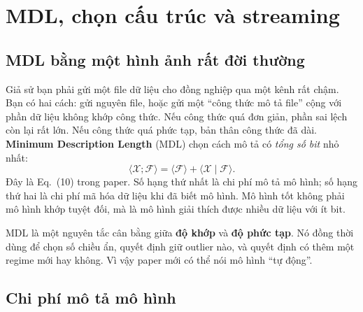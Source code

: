\section{MDL, chọn cấu trúc và streaming}
\label{sec:mdl-streaming}

\subsection{MDL bằng một hình ảnh rất đời thường}

Giả sử bạn phải gửi một file dữ liệu cho đồng nghiệp qua một kênh rất chậm. Bạn có hai cách:
gửi nguyên file, hoặc gửi một ``công thức mô tả file'' cộng với phần dữ liệu không khớp công thức.
Nếu công thức quá đơn giản, phần sai lệch còn lại rất lớn. Nếu công thức quá phức tạp, bản thân
công thức đã dài. \textbf{Minimum Description Length} (MDL) chọn cách mô tả có \emph{tổng số bit}
nhỏ nhất:
\begin{equation}
  \bigl\langle \mathcal{X};\mathcal{F}\bigr\rangle
  =\bigl\langle \mathcal{F}\bigr\rangle
   +\bigl\langle \mathcal{X}\mid\mathcal{F}\bigr\rangle.
  \label{eq:mdl-total}
\end{equation}
Đây là Eq.~(10) trong paper. Số hạng thứ nhất là chi phí mô tả mô hình; số hạng thứ hai là chi phí
mã hóa dữ liệu khi đã biết mô hình. Mô hình tốt không phải mô hình khớp tuyệt đối, mà là mô hình
giải thích được nhiều dữ liệu với ít bit.

\begin{keypoint}
MDL là một nguyên tắc cân bằng giữa \textbf{độ khớp} và \textbf{độ phức tạp}. Nó đồng thời dùng
để chọn số chiều ẩn, quyết định giữ outlier nào, và quyết định có thêm một regime mới hay không.
Vì vậy paper mới có thể nói mô hình ``tự động''.
\end{keypoint}

\subsection{Chi phí mô tả mô hình}

